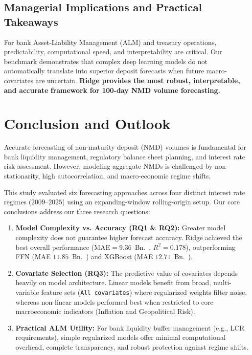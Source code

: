 \documentclass[11pt,a4paper]{article}
\begin{document}
\subsection{Managerial Implications and Practical Takeaways}
For bank Asset-Liability Management (ALM) and treasury operations, predictability, computational speed, and interpretability are critical. Our benchmark demonstrates that complex deep learning models do not automatically translate into superior deposit forecasts when future macro-covariates are uncertain. \textbf{Ridge provides the most robust, interpretable, and accurate framework for 100-day NMD volume forecasting.}

\section{Conclusion and Outlook}
\label{sec:conclusion}

Accurate forecasting of non-maturity deposit (NMD) volumes is fundamental for bank liquidity management, regulatory balance sheet planning, and interest rate risk assessment. However, modeling aggregate NMDs is challenged by non-stationarity, high autocorrelation, and macro-economic regime shifts.

This study evaluated six forecasting approaches across four distinct interest rate regimes ($2009$--$2025$) using an expanding-window rolling-origin setup. Our core conclusions address our three research questions:
\begin{enumerate}
    \item \textbf{Model Complexity vs. Accuracy (RQ1 \& RQ2):} Greater model complexity does not guarantee higher forecast accuracy. Ridge achieved the best overall performance ($\text{MAE} = 9.36$~Bn.~\texteuro, $R^2 = 0.178$), outperforming FFN (MAE $11.85$~Bn.~\texteuro) and XGBoost (MAE $12.71$~Bn.~\texteuro).
    \item \textbf{Covariate Selection (RQ3):} The predictive value of covariates depends heavily on model architecture. Linear models benefit from broad, multi-variable feature sets (\texttt{All covariates}) where regularized weights filter noise, whereas non-linear models performed best when restricted to core macroeconomic indicators (Inflation and Geopolitical Risk).
    \item \textbf{Practical ALM Utility:} For bank liquidity buffer management (e.g., LCR requirements), simple regularized models offer minimal computational overhead, complete transparency, and robust protection against regime shifts.
\end{enumerate}
\end{document}
